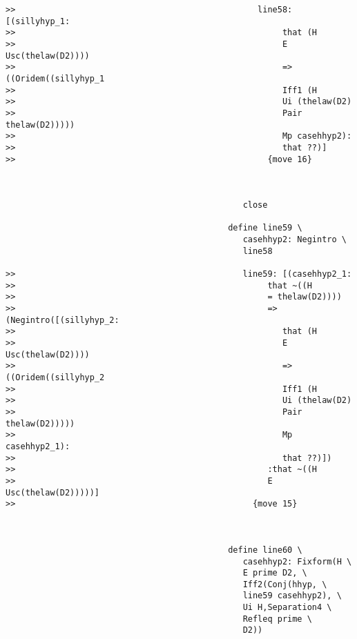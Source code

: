 \documentclass[12pt]{article}
\begin{document}
\begin{verbatim}
>>                                                 line58: [(sillyhyp_1:
>>                                                      that (H
>>                                                      E Usc(thelaw(D2))))
>>                                                      => ((Oridem((sillyhyp_1
>>                                                      Iff1 (H
>>                                                      Ui (thelaw(D2)
>>                                                      Pair thelaw(D2)))))
>>                                                      Mp casehhyp2):
>>                                                      that ??)]
>>                                                   {move 16}



                                                close

                                             define line59 \
                                                casehhyp2: Negintro \
                                                line58

>>                                              line59: [(casehhyp2_1:
>>                                                   that ~((H
>>                                                   = thelaw(D2))))
>>                                                   => (Negintro([(sillyhyp_2:
>>                                                      that (H
>>                                                      E Usc(thelaw(D2))))
>>                                                      => ((Oridem((sillyhyp_2
>>                                                      Iff1 (H
>>                                                      Ui (thelaw(D2)
>>                                                      Pair thelaw(D2)))))
>>                                                      Mp casehhyp2_1):
>>                                                      that ??)])
>>                                                   :that ~((H
>>                                                   E Usc(thelaw(D2)))))]
>>                                                {move 15}



                                             define line60 \
                                                casehhyp2: Fixform(H \
                                                E prime D2, \
                                                Iff2(Conj(hhyp, \
                                                line59 casehhyp2), \
                                                Ui H,Separation4 \
                                                Refleq prime \
                                                D2))


\end{verbatim}
\end{document}
